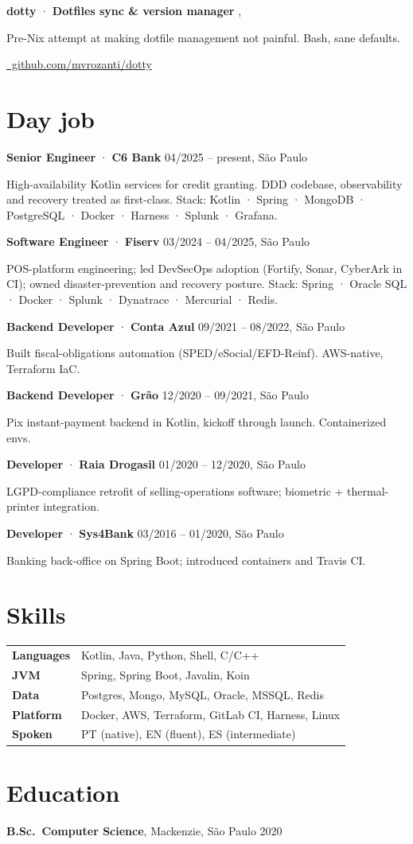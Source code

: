 \documentclass[10pt,a4paper]{article}
\newcommand{\role}[4]{\noindent\textbf{\large #1} \textcolor{accent}{·} \textbf{#2} \hfill \textcolor{muted}{#3, #4}\par\vspace{2pt}}
\begin{document}
\role{dotty}{Dotfiles sync \& version manager}{}{}
Pre-Nix attempt at making dotfile management not painful. Bash, sane defaults.\par\vspace{3pt}
\href{https://github.com/mvrozanti/dotty}{\small\faGithub\ github.com/mvrozanti/dotty}

\section{Day job}

\role{Senior Engineer}{C6 Bank}{04/2025 -- present}{São Paulo}
High-availability Kotlin services for credit granting. DDD codebase, observability and recovery treated as first-class. Stack: Kotlin · Spring · MongoDB · PostgreSQL · Docker · Harness · Splunk · Grafana.

\role{Software Engineer}{Fiserv}{03/2024 -- 04/2025}{São Paulo}
POS-platform engineering; led DevSecOps adoption (Fortify, Sonar, CyberArk in CI); owned disaster-prevention and recovery posture. Stack: Spring · Oracle SQL · Docker · Splunk · Dynatrace · Mercurial · Redis.

\role{Backend Developer}{Conta Azul}{09/2021 -- 08/2022}{São Paulo}
Built fiscal-obligations automation (SPED/eSocial/EFD-Reinf). AWS-native, Terraform IaC.

\role{Backend Developer}{Grão}{12/2020 -- 09/2021}{São Paulo}
Pix instant-payment backend in Kotlin, kickoff through launch. Containerized envs.

\role{Developer}{Raia Drogasil}{01/2020 -- 12/2020}{São Paulo}
LGPD-compliance retrofit of selling-operations software; biometric + thermal-printer integration.

\role{Developer}{Sys4Bank}{03/2016 -- 01/2020}{São Paulo}
Banking back-office on Spring Boot; introduced containers and Travis CI.

\section{Skills}
\noindent
\begin{tabularx}{\linewidth}{@{}lX@{}}
\textbf{Languages} & Kotlin, Java, Python, Shell, C/C++ \\
\textbf{JVM} & Spring, Spring Boot, Javalin, Koin \\
\textbf{Data} & Postgres, Mongo, MySQL, Oracle, MSSQL, Redis \\
\textbf{Platform} & Docker, AWS, Terraform, GitLab CI, Harness, Linux \\
\textbf{Spoken} & PT (native), EN (fluent), ES (intermediate) \\
\end{tabularx}

\section{Education}
\noindent\textbf{B.Sc.\ Computer Science}, Mackenzie, São Paulo \hfill 2020
\end{document}
